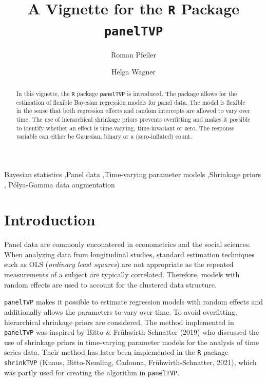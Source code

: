 \documentclass[a4paper, preprint, 3p,
authoryear]{elsarticle} %
\begin{document}
\begin{frontmatter}

  \title{A Vignette for the \texttt{R} Package \texttt{panelTVP}}
    \author[]{Roman Pfeiler%
  }
    \author[]{Helga Wagner%
  }
  
  \begin{abstract}
  In this vignette, the \texttt{R} package \texttt{panelTVP} is
  introduced. The package allows for the estimation of flexible Bayesian
  regression models for panel data. The model is flexible in the sense
  that both regression effects and random intercepts are allowed to vary
  over time. The use of hierarchical shrinkage priors prevents
  overfitting and makes it possible to identify whether an effect is
  time-varying, time-invariant or zero. The response variable can either
  be Gaussian, binary or a (zero-inflated) count.
  \end{abstract}
    \begin{keyword}
    Bayesian statistics \sep Panel data \sep Time-varying parameter
models \sep Shrinkage priors \sep 
    Pólya-Gamma data augmentation
  \end{keyword}
  
 \end{frontmatter}

\section{Introduction}\label{introduction}

Panel data are commonly encountered in econometrics and the social
sciences. When analyzing data from longitudinal studies, standard
estimation techniques such as OLS (\textit{ordinary least squares}) are
not appropriate as the repeated measurements of a subject are typically
correlated. Therefore, models with random effects are used to account
for the clustered data structure.

\texttt{panelTVP} makes it possible to estimate regression models with
random effects and additionally allows the parameters to vary over time.
To avoid overfitting, hierarchical shrinkage priors are considered. The
method implemented in \texttt{panelTVP} was inspired by Bitto \&
Frühwirth-Schnatter (2019) who discussed the use of shrinkage priors in
time-varying parameter models for the analysis of time series data.
Their method has later been implemented in the \texttt{R} package
\texttt{shrinkTVP} (Knaus, Bitto-Nemling, Cadonna, Frühwirth-Schnatter,
2021), which was partly used for creating the algorithm in
\texttt{panelTVP}.
\end{document}

